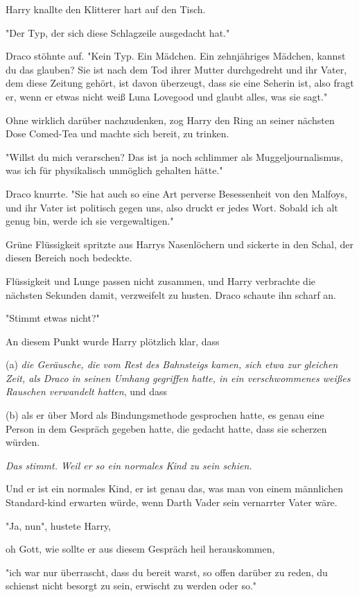 {Harry knallte den Klitterer hart auf den Tisch.

"Der Typ, der sich diese Schlagzeile ausgedacht hat."

Draco stöhnte auf. "Kein Typ. Ein Mädchen. Ein zehnjähriges Mädchen, kannst du das glauben? Sie ist nach dem Tod ihrer Mutter durchgedreht und ihr Vater, dem diese Zeitung gehört, ist davon überzeugt, dass sie eine Seherin ist, also fragt er, wenn er etwas nicht weiß Luna Lovegood und glaubt alles, was sie sagt."

Ohne wirklich darüber nachzudenken, zog Harry den Ring an seiner nächsten Dose Comed-Tea und machte sich bereit, zu trinken.

"Willst du mich verarschen? Das ist ja noch schlimmer als Muggeljournalismus, was ich für physikalisch unmöglich gehalten hätte."

Draco knurrte. "Sie hat auch so eine Art perverse Besessenheit von den Malfoys, und ihr Vater ist politisch gegen uns, also druckt er jedes Wort. Sobald ich alt genug bin, werde ich sie vergewaltigen."

Grüne Flüssigkeit spritzte aus Harrys Nasenlöchern und sickerte in den Schal, der diesen Bereich noch bedeckte.

Flüssigkeit und Lunge passen nicht zusammen, und Harry verbrachte die nächsten Sekunden damit, verzweifelt zu husten. Draco schaute ihn scharf an.

"Stimmt etwas nicht?"

An diesem Punkt wurde Harry plötzlich klar, dass

(a) \emph{die Geräusche, die vom Rest des Bahnsteigs kamen, sich etwa zur gleichen Zeit, als Draco in seinen Umhang gegriffen hatte, in ein verschwommenes weißes Rauschen verwandelt hatten}, und dass

(b) als er über Mord als Bindungsmethode gesprochen hatte, es genau eine Person in dem Gespräch gegeben hatte, die gedacht hatte, dass sie scherzen würden.

\emph{Das stimmt. Weil er so ein normales Kind zu sein schien.}

Und er ist ein normales Kind, er ist genau das, was man von einem männlichen Standard-kind erwarten würde, wenn Darth Vader sein vernarrter Vater wäre.

"Ja, nun", hustete Harry,

oh Gott, wie sollte er aus diesem Gespräch heil herauskommen,

"ich war nur überrascht, dass du bereit warst, so offen darüber zu reden, du schienst nicht besorgt zu sein, erwischt zu werden oder so."

}

